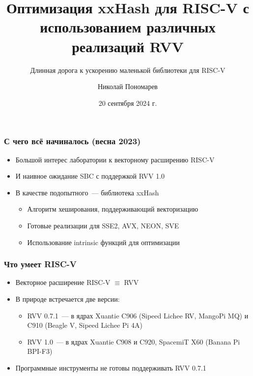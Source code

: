 \documentclass[
    aspectratio=169,
]{beamer}
\title[Оптимизация xxHash для RISC-V]{Оптимизация xxHash для RISC-V с использованием различных реализаций RVV}
\subtitle{Длинная дорога к ускорению маленькой библиотеки для RISC-V}
\author{Николай Пономарев}
\institute[Матмех СПбГУ]{Математико-механический факультет СПбГУ}
\date{20 сентября 2024 г.}
\begin{document}
\begin{frame}
    \maketitle
\end{frame}




\begin{frame}
    \frametitle{С чего всё начиналось (весна 2023)}

    \begin{itemize}[<+->]
        \item Большой интерес лаборатории к векторному расширению RISC-V
        \item И наивное ожидание SBC с поддержкой RVV 1.0
        \item В качестве подопытного~--- библиотека xxHash
              \begin{itemize}
                  \item Алгоритм хеширования, поддерживающий векторизацию
                  \item Готовые реализации для SSE2, AVX, NEON, SVE
                  \item Использование intrinsic функций для оптимизации
              \end{itemize}
    \end{itemize}

\end{frame}


\begin{frame}
    \frametitle{Что умеет RISC-V}

    \begin{itemize}
        \item Векторное расширение RISC-V $\equiv$ RVV
        \item В природе встречается две версии:
              \begin{itemize}
                  \item RVV 0.7.1~--- в ядрах Xuantie C906 (Sipeed Lichee RV, MangoPi MQ) и C910 (Beagle V, Sipeed Lichee Pi 4A)
                  \item RVV 1.0~--- в ядрах Xuantie C908 и C920, SpacemiT X60 (Banana Pi BPI-F3)
              \end{itemize}
        \item<+-> Программные инструменты не готовы поддерживать RVV 0.7.1
    \end{itemize}

    \ %


\end{frame}
\end{document}
